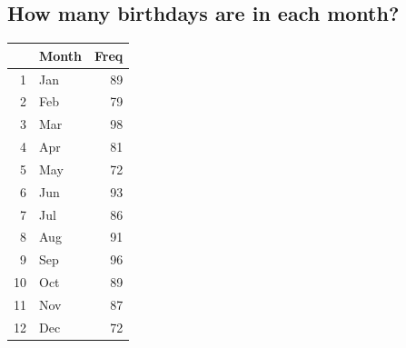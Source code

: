 \documentclass{article}\usepackage[]{graphicx}\usepackage[]{color}
\begin{document}
\begin{figure}[!hbt]
    \centering
\end{figure}
\clearpage

\subsection{How many birthdays are in each month?}
\begin{table}[ht]
\centering
\begin{tabular}{rlr}
  \hline
 & Month & Freq \\ 
  \hline
1 & Jan &  89 \\ 
  2 & Feb &  79 \\ 
  3 & Mar &  98 \\ 
  4 & Apr &  81 \\ 
  5 & May &  72 \\ 
  6 & Jun &  93 \\ 
  7 & Jul &  86 \\ 
  8 & Aug &  91 \\ 
  9 & Sep &  96 \\ 
  10 & Oct &  89 \\ 
  11 & Nov &  87 \\ 
  12 & Dec &  72 \\ 
   \hline
\end{tabular}
\end{table}
\end{document}
